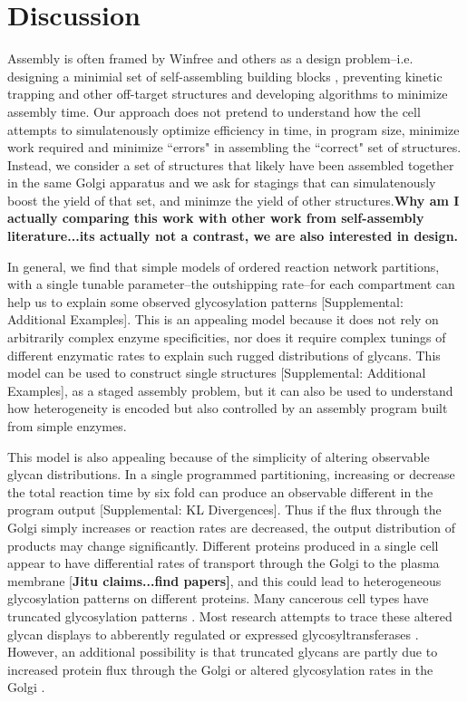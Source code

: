 \documentclass[twocolumn]{article}
\begin{document}
\section*{Discussion}
Assembly is often framed by Winfree and others as a design problem--i.e. designing a minimial set of self-assembling building blocks \cite{Rothemund2000}, preventing kinetic trapping \cite{Fujibayashi2009, Winfree2004} and other off-target structures and developing algorithms to minimize assembly time. Our approach does not pretend to understand how the cell attempts to simulatenously optimize efficiency in time, in program size, minimize work required and minimize ``errors" in assembling the ``correct" set of structures. Instead, we consider a set of structures that likely have been assembled together in the same Golgi apparatus and we ask for stagings that can simulatenously boost the yield of that set, and minimze the yield of other structures.\textbf{Why am I actually comparing this work with other work from self-assembly literature...its actually not a contrast, we are also interested in design.} 

In general, we find that simple models of ordered reaction network partitions, with a single tunable parameter--the outshipping rate--for each compartment can help us to explain some observed glycosylation patterns [Supplemental: Additional Examples]. This is an appealing model because it does not rely on arbitrarily complex enzyme specificities, nor does it require complex tunings of different enzymatic rates to explain such rugged distributions of glycans. This model can be used to construct single structures [Supplemental: Additional Examples], as a staged assembly problem, but it can also be used to understand how heterogeneity is encoded but also controlled by an assembly program built from simple enzymes. 

This model is also appealing because of the simplicity of altering observable glycan distributions. In a single programmed partitioning, increasing or decrease the total reaction time by six fold can produce an observable different in the program output [Supplemental: KL Divergences]. Thus if the flux through the Golgi simply increases or reaction rates are decreased, the output distribution of products may change significantly.  Different proteins produced in a single cell appear to have differential rates of transport through the Golgi to the plasma membrane [\textbf{Jitu claims...find papers]}, and this could lead to heterogeneous glycosylation patterns on different proteins. Many cancerous cell types have truncated glycosylation patterns \cite{Lloyd1996}. Most research attempts to trace these altered glycan displays to abberently regulated or expressed glycosyltransferases \cite{Kannagi2009}. However, an additional possibility is that truncated glycans are partly due to increased protein flux through the Golgi or altered glycosylation rates in the Golgi \cite{Kellokumpu2002,Brockhausen2006}.
\end{document}
